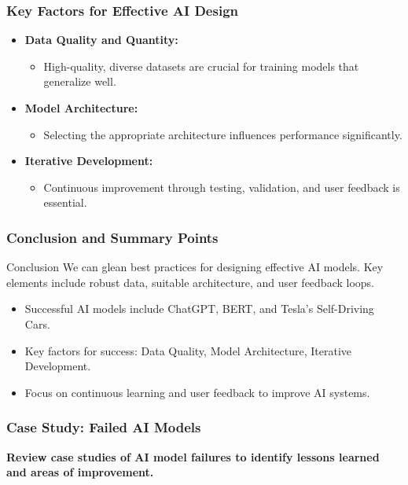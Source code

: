 \documentclass[aspectratio=169]{beamer}
\begin{document}
\begin{frame}[fragile]
    \frametitle{Key Factors for Effective AI Design}
    \begin{itemize}
        \item \textbf{Data Quality and Quantity:} 
        \begin{itemize}
            \item High-quality, diverse datasets are crucial for training models that generalize well.
        \end{itemize}
        
        \item \textbf{Model Architecture:} 
        \begin{itemize}
            \item Selecting the appropriate architecture influences performance significantly.
        \end{itemize}
        
        \item \textbf{Iterative Development:} 
        \begin{itemize}
            \item Continuous improvement through testing, validation, and user feedback is essential.
        \end{itemize}
    \end{itemize}
\end{frame}

\begin{frame}[fragile]
    \frametitle{Conclusion and Summary Points}
    \begin{block}{Conclusion}
        We can glean best practices for designing effective AI models. Key elements include robust data, suitable architecture, and user feedback loops.
    \end{block}

    \begin{itemize}
        \item Successful AI models include ChatGPT, BERT, and Tesla’s Self-Driving Cars.
        \item Key factors for success: Data Quality, Model Architecture, Iterative Development.
        \item Focus on continuous learning and user feedback to improve AI systems.
    \end{itemize}
\end{frame}

\begin{frame}[fragile]
    \frametitle{Case Study: Failed AI Models}
    \textbf{Review case studies of AI model failures to identify lessons learned and areas of improvement.}
\end{frame}
\end{document}
